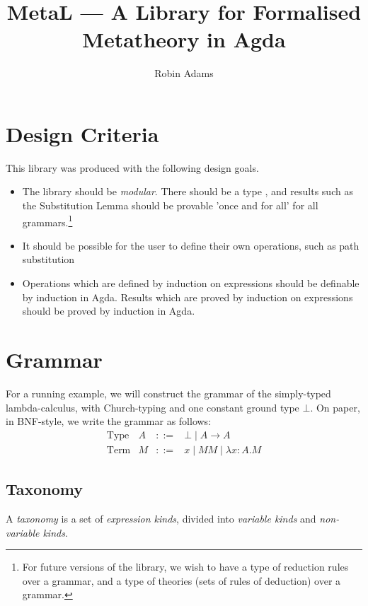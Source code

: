 \documentclass{article}
\title{MetaL --- A Library for Formalised Metatheory in Agda}
\author{Robin Adams}
\begin{document}
\maketitle

\section{Design Criteria}

This library was produced with the following design goals.

\begin{itemize}
\item
The library should be \emph{modular}.  There should be a type , and results such as the Substitution Lemma 
should be
provable 'once and for all' for all grammars.\footnote{For future versions of the library, we wish to have a type of reduction rules over a grammar, and a type of theories (sets of rules of deduction) over a grammar.}
\item
It should be possible for the user to define their own operations, such as path substitution %
\item
Operations which are defined by induction on expressions should be definable by induction in Agda.  Results which are proved by induction on expressions should be proved by induction in Agda.
\end{itemize}

\section{Grammar}

For a running example, we will construct the grammar of the simply-typed lambda-calculus, with Church-typing and one constant ground type $\bot$.  On paper, in BNF-style, we write the grammar as follows:
\[ \begin{array}{lrcl}
\text{Type} & A & ::= & \bot \mid A \rightarrow A \\
\text{Term} & M & ::= & x \mid MM \mid \lambda x : A . M
\end{array} \]

\subsection{Taxonomy}

A \emph{taxonomy} is a set of \emph{expression kinds}, divided into \emph{variable kinds} and \emph{non-variable kinds}.

\end{document}
